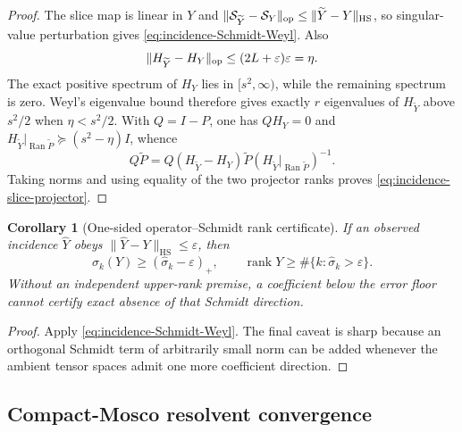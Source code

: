 \documentclass[11pt]{article}
\numberwithin{equation}{section}
\newtheorem{corollary}[theorem]{Corollary}
\theoremstyle{definition}
\theoremstyle{remark}
\newcommand{\rank}{\operatorname{rank}}
\newcommand{\Ran}{\operatorname{Ran}}
\newcommand{\HS}{\mathrm{HS}}
\newcommand{\norm}[1]{\lVert#1\rVert}
\begin{document}
\begin{proof}
The slice map is linear in $Y$ and
$\|\mathcal S_{\widetilde Y}-\mathcal S_Y\|_{\rm op}
 \le\|\widetilde Y-Y\|_{\HS}$, so singular-value perturbation gives
\eqref{eq:incidence-Schmidt-Weyl}.  Also
\[
 \norm{H_{\widetilde Y}-H_Y}_{\rm op}
 \le(2L+\varepsilon)\varepsilon=\eta.
\]
The exact positive spectrum of $H_Y$ lies in $[s^2,\infty)$, while the
remaining spectrum is zero.  Weyl's eigenvalue bound therefore gives exactly
$r$ eigenvalues of $H_{\widetilde Y}$ above $s^2/2$ when $\eta<s^2/2$.
With $Q=I-P$, one has $QH_Y=0$ and
$H_{\widetilde Y}|_{\Ran\widetilde P}\succeq(s^2-\eta)I$, whence
\[
 Q\widetilde P
 =Q(H_{\widetilde Y}-H_Y)\widetilde P
   (H_{\widetilde Y}|_{\Ran\widetilde P})^{-1}.
\]
Taking norms and using equality of the two projector ranks proves
\eqref{eq:incidence-slice-projector}.
\end{proof}

\begin{corollary}[One-sided operator--Schmidt rank certificate]
\label{cor:incidence-one-sided-rank}
If an observed incidence $\widehat Y$ obeys
$\|\widehat Y-Y\|_{\HS}\le\varepsilon$, then
\begin{equation}
 \sigma_k(Y)\ge(\widehat\sigma_k-\varepsilon)_+,\qquad
 \rank Y\ge\#\{k:\widehat\sigma_k>\varepsilon\}.
 \label{eq:incidence-one-sided-rank}
\end{equation}
Without an independent upper-rank premise, a coefficient below the error floor
cannot certify exact absence of that Schmidt direction.
\end{corollary}

\begin{proof}
Apply \eqref{eq:incidence-Schmidt-Weyl}.  The final caveat is sharp because an
orthogonal Schmidt term of arbitrarily small norm can be added whenever the
ambient tensor spaces admit one more coefficient direction.
\end{proof}


\subsection{Compact-Mosco resolvent convergence}
\label{app:compact-mosco}
\end{document}

